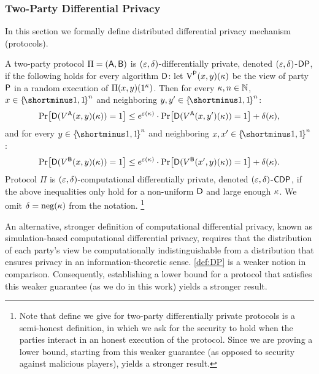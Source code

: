 \subsubsection{Two-Party Differential Privacy}\label{sec:DP}
In this section we formally define distributed differential privacy mechanism (\ie protocols). %

\begin{definition}\label{def:DP}%
	A two-party protocol $\Pi=(\mathsf{A},\mathsf{B})$ is {\sf $(\varepsilon,\delta)$-differentially private}, denoted $(\varepsilon,\delta)$-${\sf DP}$, if the following holds for every algorithm $\mathsf{D}$: let $\operatorname{V}^{\mathsf{P}}(x,y)(\kappa)$ be the view of party $\mathsf{P}$ in a random execution of $\Pi(x,y)(1^\kappa)$. Then for every $\kappa,n \in {\mathbb{N}}$, $x\in \oo^n$ and neighboring $y,y'\in\oo^n$:
	\begin{align*}
	\pr{\Dc(V^\Ac(x,y)(\pk))=1}\le e^{\eps(\pk)}\cdot \pr{\Dc(V^\Ac (x,y')(\pk))=1}+\delta(\pk),
	\end{align*} 
	and for every $y\in \oo^n$ and neighboring $x,x'\in\oo^{n}$:
	\begin{align*}
	\pr{\Dc(V^\Bc(x,y)(\pk))=1}\le e^{\eps(\pk)}\cdot \pr{\Dc(V^\Bc (x',y)(\pk))=1}+\delta(\pk).
	\end{align*} 	
	Protocol $\Pi$ is {\sf $(\varepsilon,\delta)$-computational differentially private}, denoted $(\varepsilon,\delta)$-${\sf CDP}$, if the above inequalities only hold for a non-uniform \ppt $\mathsf{D}$ and large enough $\kappa$. We omit $\delta = \operatorname{neg}(\kappa)$ from the notation. \footnote{Note that define we give for two-party differentially private protocols is a semi-honest definition, in which we ask for the security to hold when the parties interact in an honest execution of the protocol. Since we are proving a lower bound, starting from this weaker guarantee (as opposed to security against malicious players), yields a stronger result.}
\end{definition}

\begin{remark}\label{rem:comDPChannel} 
	An alternative, stronger definition of computational differential privacy, known as simulation-based computational differential privacy, requires that the distribution of each party’s view be computationally indistinguishable from a distribution that ensures privacy in an information-theoretic sense. \cref{def:DP} is a weaker notion in comparison. Consequently, establishing a lower bound for a protocol that satisfies this weaker guarantee (as we do in this work) yields a stronger result.%
\end{remark}




